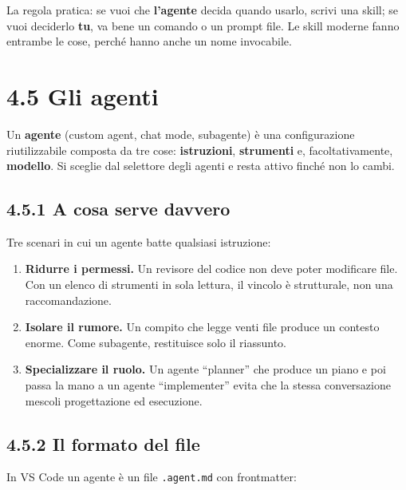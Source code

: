 \documentclass[
  italian,
  10pt,
]{book}
\providecommand{\tightlist}{%
  \setlength{\itemsep}{0pt}\setlength{\parskip}{0pt}}
\begin{document}
La regola pratica: se vuoi che \textbf{l'agente} decida quando usarlo,
scrivi una skill; se vuoi deciderlo \textbf{tu}, va bene un comando o un
prompt file. Le skill moderne fanno entrambe le cose, perché hanno anche
un nome invocabile.

\section{4.5 Gli agenti}\label{gli-agenti}

Un \textbf{agente} (custom agent, chat mode, subagente) è una
configurazione riutilizzabile composta da tre cose: \textbf{istruzioni},
\textbf{strumenti} e, facoltativamente, \textbf{modello}. Si sceglie dal
selettore degli agenti e resta attivo finché non lo cambi.

\subsection{4.5.1 A cosa serve davvero}\label{a-cosa-serve-davvero}

Tre scenari in cui un agente batte qualsiasi istruzione:

\begin{enumerate}
\def\labelenumi{\arabic{enumi}.}
\tightlist
\item
  \textbf{Ridurre i permessi.} Un revisore del codice non deve poter
  modificare file. Con un elenco di strumenti in sola lettura, il
  vincolo è strutturale, non una raccomandazione.
\item
  \textbf{Isolare il rumore.} Un compito che legge venti file produce un
  contesto enorme. Come subagente, restituisce solo il riassunto.
\item
  \textbf{Specializzare il ruolo.} Un agente ``planner'' che produce un
  piano e poi passa la mano a un agente ``implementer'' evita che la
  stessa conversazione mescoli progettazione ed esecuzione.
\end{enumerate}

\subsection{4.5.2 Il formato del file}\label{il-formato-del-file}

In VS Code un agente è un file \texttt{.agent.md} con frontmatter:
\end{document}
